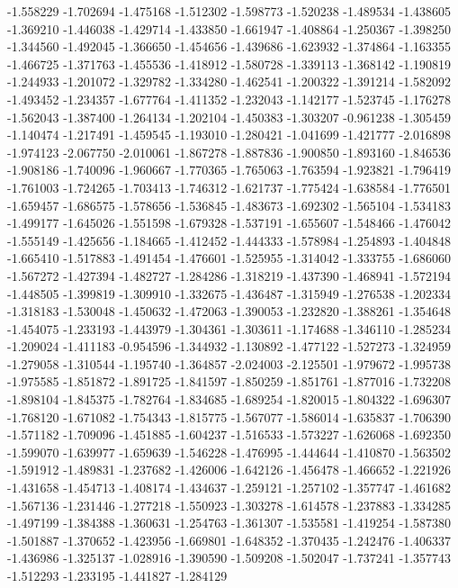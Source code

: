 -1.558229
-1.702694
-1.475168
-1.512302
-1.598773
-1.520238
-1.489534
-1.438605
-1.369210
-1.446038
-1.429714
-1.433850
-1.661947
-1.408864
-1.250367
-1.398250
-1.344560
-1.492045
-1.366650
-1.454656
-1.439686
-1.623932
-1.374864
-1.163355
-1.466725
-1.371763
-1.455536
-1.418912
-1.580728
-1.339113
-1.368142
-1.190819
-1.244933
-1.201072
-1.329782
-1.334280
-1.462541
-1.200322
-1.391214
-1.582092
-1.493452
-1.234357
-1.677764
-1.411352
-1.232043
-1.142177
-1.523745
-1.176278
-1.562043
-1.387400
-1.264134
-1.202104
-1.450383
-1.303207
-0.961238
-1.305459
-1.140474
-1.217491
-1.459545
-1.193010
-1.280421
-1.041699
-1.421777
-2.016898
-1.974123
-2.067750
-2.010061
-1.867278
-1.887836
-1.900850
-1.893160
-1.846536
-1.908186
-1.740096
-1.960667
-1.770365
-1.765063
-1.763594
-1.923821
-1.796419
-1.761003
-1.724265
-1.703413
-1.746312
-1.621737
-1.775424
-1.638584
-1.776501
-1.659457
-1.686575
-1.578656
-1.536845
-1.483673
-1.692302
-1.565104
-1.534183
-1.499177
-1.645026
-1.551598
-1.679328
-1.537191
-1.655607
-1.548466
-1.476042
-1.555149
-1.425656
-1.184665
-1.412452
-1.444333
-1.578984
-1.254893
-1.404848
-1.665410
-1.517883
-1.491454
-1.476601
-1.525955
-1.314042
-1.333755
-1.686060
-1.567272
-1.427394
-1.482727
-1.284286
-1.318219
-1.437390
-1.468941
-1.572194
-1.448505
-1.399819
-1.309910
-1.332675
-1.436487
-1.315949
-1.276538
-1.202334
-1.318183
-1.530048
-1.450632
-1.472063
-1.390053
-1.232820
-1.388261
-1.354648
-1.454075
-1.233193
-1.443979
-1.304361
-1.303611
-1.174688
-1.346110
-1.285234
-1.209024
-1.411183
-0.954596
-1.344932
-1.130892
-1.477122
-1.527273
-1.324959
-1.279058
-1.310544
-1.195740
-1.364857
-2.024003
-2.125501
-1.979672
-1.995738
-1.975585
-1.851872
-1.891725
-1.841597
-1.850259
-1.851761
-1.877016
-1.732208
-1.898104
-1.845375
-1.782764
-1.834685
-1.689254
-1.820015
-1.804322
-1.696307
-1.768120
-1.671082
-1.754343
-1.815775
-1.567077
-1.586014
-1.635837
-1.706390
-1.571182
-1.709096
-1.451885
-1.604237
-1.516533
-1.573227
-1.626068
-1.692350
-1.599070
-1.639977
-1.659639
-1.546228
-1.476995
-1.444644
-1.410870
-1.563502
-1.591912
-1.489831
-1.237682
-1.426006
-1.642126
-1.456478
-1.466652
-1.221926
-1.431658
-1.454713
-1.408174
-1.434637
-1.259121
-1.257102
-1.357747
-1.461682
-1.567136
-1.231446
-1.277218
-1.550923
-1.303278
-1.614578
-1.237883
-1.334285
-1.497199
-1.384388
-1.360631
-1.254763
-1.361307
-1.535581
-1.419254
-1.587380
-1.501887
-1.370652
-1.423956
-1.669801
-1.648352
-1.370435
-1.242476
-1.406337
-1.436986
-1.325137
-1.028916
-1.390590
-1.509208
-1.502047
-1.737241
-1.357743
-1.512293
-1.233195
-1.441827
-1.284129
